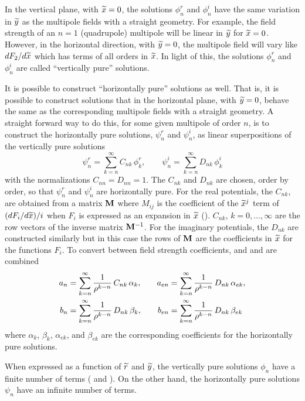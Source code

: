 In the vertical plane, with ${\widetilde x} = 0$, the solutions $\phi_n^r$ and $\phi_n^i$ have the same
variation in ${\widetilde y}$ as the multipole fields with a straight geometry. For example, the field
strength of an $n = 1$ (quadrupole) multipole will be linear in ${\widetilde y}$ for ${\widetilde x} = 0$. However, in the
horizontal direction, with ${\widetilde y} = 0$, the multipole field will vary like $dF_2/d{\widetilde x}$ which has
terms of all orders in ${\widetilde x}$. In light of this, the solutions $\phi_n^r$ and $\phi_n^i$ are
called ``vertically pure'' solutions.

It is possible to construct ``horizontally pure'' solutions as well. That is, it is possible to
construct solutions that in the horizontal plane, with ${\widetilde y} = 0$, behave the same as the corresponding
multipole fields with a straight geometry. A straight forward way to do this, for some given
multipole of order $n$, is to construct the horizontally pure solutions, $\psi_n^r$ and $\psi_n^i$,
as linear superpositions of the vertically pure solutions
\begin{equation}
  \psi_n^r = \sum_{k = n}^\infty C_{nk} \, \phi_k^r, \qquad
  \psi_n^i = \sum_{k = n}^\infty D_{nk} \, \phi_k^i
  \label{p1rc}
\end{equation}
with the normalizations $C_{nn} = D_{nn} = 1$. The $C_{nk}$ and $D_{nk}$ are chosen, order
by order, so that $\psi_n^r$ and $\psi_n^i$ are horizontally pure. For the real
potentials, the $C_{nk}$, are obtained from a matrix ${\bf M}$ where $M_{ij}$ is the
coefficient of the ${\widetilde x}^j$ term of $(dF_i/d{\widetilde x})/i$ when $F_i$ is expressed as an expansion in
${\widetilde x}$ (). $C_{nk}$, $k = 0, \ldots, \infty$ are the row vectors of the inverse
matrix ${\bf M}^{-1}$. For the imaginary potentials, the $D_{nk}$ are constructed similarly
but in this case the rows of ${\bf M}$ are the coefficients in ${\widetilde x}$ for the functions $F_i$.
To convert between field strength coefficients,  and  and 
are combined
\begin{alignat}{3}
  a_n &= \sum_{k = n}^\infty \frac{1}{\rho^{k-n}} \, C_{nk} \, \alpha_k, \quad 
  &a_{en} &= \sum_{k = n}^\infty \frac{1}{\rho^{k-n}} \, D_{nk} \, \alpha_{ek}, \nonumber \\
  b_n &= \sum_{k = n}^\infty \frac{1}{\rho^{k-n}} \, D_{nk} \, \beta_k, \quad
  &b_{en} &= \sum_{k = n}^\infty \frac{1}{\rho^{k-n}} \, D_{nk} \, \beta_{ek}
\end{alignat}
where $\alpha_k$, $\beta_k$, $\alpha_{ek}$, and $\beta_{ek}$ are the corresponding coefficients
for the horizontally pure solutions.

When expressed as a function of ${\widetilde r}$ and ${\widetilde y}$, the vertically pure solutions $\phi_n$ have a
finite number of terms ( and ). On the other hand, the horizontally
pure solutions $\psi_n$ have an infinite number of terms.

